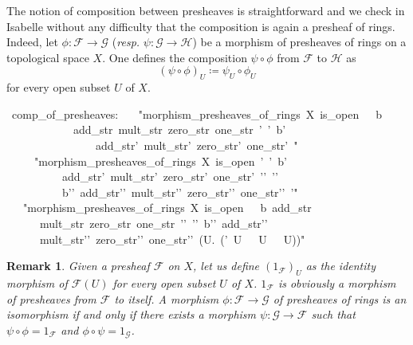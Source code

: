 \documentclass[12pt]{scrartcl}
\newtheorem{remark}[proposition]{Remark}
\begin{document}
The notion of composition between presheaves is straightforward and we check in Isabelle without any difficulty that the composition is again a presheaf of rings. \\
Indeed,	let $\phi: \mathscr{F} \rightarrow \mathscr{G}$ (\textit{resp.} $\psi: \mathscr{G} \rightarrow \mathscr{H}$) be a morphism of presheaves of rings on a topological space $X$. One defines the composition $\psi \circ \phi$ from $\mathscr{F}$ to $\mathscr{H}$ as 
	\[
	(\psi \circ \phi)_U \coloneqq \psi_U \circ \phi_U
	\]
	for every open subset $U$ of $X$.

\begin{isabelle}
\ comp\_of\_presheaves:\isanewline
\ \ \ "morphism\_presheaves\_of\_rings\ X\ is\_open\ \isasymFF \ \isasymrho \ b\ \isanewline
\ \ \ \ \ \ \ \ \ \ \ \ add\_str\ mult\_str\ zero\_str\ one\_str\ \isasymFF '\ \isasymrho '\ b'\ \isanewline
\ \ \ \ \ \ \ \ \ \ \ \ \ \ \ \ add\_str'\ mult\_str'\ zero\_str'\ one\_str'\ \isasymphi "\isanewline
\ \ \ \ \ "morphism\_presheaves\_of\_rings\ X\ is\_open\ \isasymFF '\ \isasymrho '\ b'\isanewline
\ \ \ \ \ \ \ \ \ \ add\_str'\ mult\_str'\ zero\_str'\ one\_str'\ \isasymFF '{\kern0pt}'\ \isasymrho '{\kern0pt}'\ \isanewline
\ \ \ \ \ \ \ \ \ \ b'{\kern0pt}'\ add\_str'{\kern0pt}'\ mult\_str'{\kern0pt}'\ zero\_str'{\kern0pt}'\ one\_str'{\kern0pt}'\ \isasymphi '"\isanewline
\ \ \ "morphism\_presheaves\_of\_rings\ X\ is\_open\ \isasymFF \ \isasymrho \ b\ add\_str\isanewline
\ \ \ \ \ \ mult\_str\ zero\_str\ one\_str\ \isasymFF '{\kern0pt}'\ \isasymrho '{\kern0pt}'\ b'{\kern0pt}'\ add\_str'{\kern0pt}'\ \isanewline
\ \ \ \ \ \ mult\_str'{\kern0pt}'\ zero\_str'{\kern0pt}'\ one\_str'{\kern0pt}'\ (\isasymlambda U.\ (\isasymphi '\ U\ \isasymcirc \ \isasymphi \ U\ \isasymdown \ \isasymFF \ U))"
\end{isabelle}

\begin{remark}
	Given a presheaf $\mathscr{F}$ on $X$, let us define $(1_{\mathscr{F}})_U$ as the identity morphism of $\mathscr{F}(U)$ for every open subset $U$ of $X$. $1_{\mathscr{F}}$ is obviously a morphism of presheaves from $\mathscr{F}$ to itself. A morphism $\phi: \mathscr{F} \rightarrow \mathscr{G}$ of presheaves of rings is an isomorphism if and only if there exists a morphism $\psi: \mathscr{G} \rightarrow \mathscr{F}$ such that $\psi \circ \phi = 1_{\mathscr{F}}$ and $\phi \circ \psi = 1_{\mathscr{G}}$.  
\end{remark}
\end{document}
